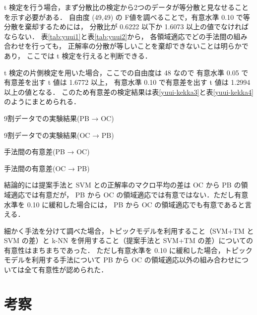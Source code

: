 \documentclass[japanese]{jnlp_1.4}
\begin{document}
t 検定を行う場合，まず分散比の検定から2つのデータが等分散と見なせることを示す必要がある．
自由度 (49,49) の F値を調べることで，有意水準 0.10 で等分散を棄却するためには，
分散比が 0.6222 以下か 1.6073 以上の値でなければならない．
\mbox{表\ref{tab:yuui1}}と\mbox{表\ref{tab:yuui2}}から，
各領域適応でどの手法間の組み合わせを行っても，
正解率の分散が等しいことを棄却できないことは明らかであり，
ここでは t 検定を行えると判断できる．

t 検定の片側検定を用いた場合，ここでの自由度は 48 なので
有意水準 0.05 で有意差を出す t 値は 1.6772 以上，
有意水準 0.10 で有意差を出す t 値は 1.2994 以上の値となる．
このため有意差の検定結果は\mbox{表\ref{yuui-kekka3}}と\mbox{表\ref{yuui-kekka4}}のようにまとめられる．

\begin{table}[t]
\begin{minipage}[t]{.49\textwidth}
\caption{9割データでの実験結果(PB → OC)}
\label{tab:yuui1}

\end{minipage} 
\hfill
\begin{minipage}[t]{.49\textwidth}
\caption{9割データでの実験結果(OC → PB)}
\label{tab:yuui2}

\end{minipage} 
\end{table}
\begin{table}[t]
\caption{手法間の有意差(PB → OC)}
\label{yuui-kekka3}

\end{table}
\begin{table}[t]
\caption{手法間の有意差(OC → PB)}
\label{yuui-kekka4}

\end{table}

結論的には提案手法と SVM との正解率のマクロ平均の差は OC から PB の領域適応では有意だが，
PB から OC の領域適応では有意ではない．ただし有意水準を 0.10 に緩和した場合には，
PB から OC の領域適応でも有意であると言える．

細かく手法を分けて調べた場合，トピックモデルを利用すること（SVM+TM と SVM の差）と
k-NN を併用すること（提案手法と SVM+TM の差）についての有意性はまちまちであった．
ただし有意水準を 0.10 に緩和した場合，トピックモデルを利用する手法について
PB から OC の領域適応以外の組み合わせについては全て有意性が認められた．





\section{考察}
\end{document}
